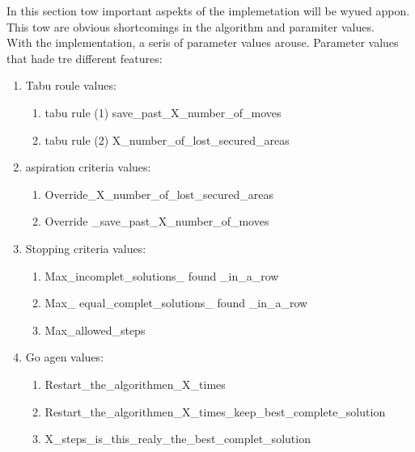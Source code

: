 \begin{enumerate}
In this section tow important aspekts of the implemetation will be wyued  appon.
This tow are obvious shortcomings in the algorithm and paramiter values.\\
With the implementation, a seris of parameter values arouse. Parameter values that hade tre different features: 
\begin{enumerate}
\item Tabu roule values:
\begin{enumerate}
\item tabu rule (1)  save\_past\_X\_number\_of\_moves 
\item tabu rule (2)  X\_number\_of\_lost\_secured\_areas
\end{enumerate} 
\item aspiration criteria values:
\begin{enumerate}
\item Override\_X\_number\_of\_lost\_secured\_areas
\item Override \_save\_past\_X\_number\_of\_moves
\end{enumerate} 
\item Stopping criteria values:
\begin{enumerate}
\item Max\_incomplet\_solutions\_ found \_in\_a\_row
\item Max\_ equal\_complet\_solutions\_ found \_in\_a\_row
\item Max\_allowed\_steps
\end{enumerate} 
\item Go agen values:
\begin{enumerate}
\item Restart\_the\_algorithmen\_X\_times
\item Restart\_the\_algorithmen\_X\_times\_keep\_best\_complete\_solution
\item X\_steps\_is\_this\_realy\_the\_best\_complet\_solution
\end{enumerate} 
\end{enumerate} 


\end{enumerate}
